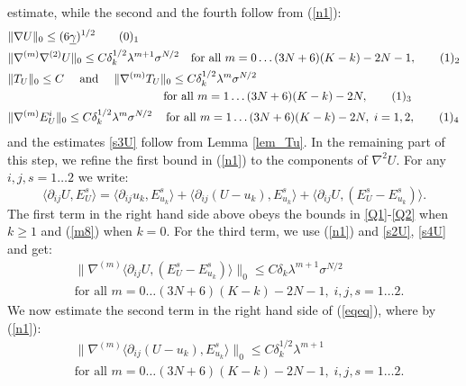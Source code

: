 \documentclass[reqno,twoside,11pt]{amsart}
\numberwithin{equation}{section}
\theoremstyle{plain}
\theoremstyle{definition}
\begin{document}
estimate, while the second and the fourth follow from (\ref{n1}):
\begin{align*}
& \|\nabla U\|_0\leq (6\underline\gamma)^{1/2}
\tag*{(\theequation)$_1$}\refstepcounter{equation} \label{s1U} \\
& \|\nabla^{(m)}\nabla^{(2)} U\|_0\leq 
C\delta_{k}^{1/2}\lambda^{m+1}\sigma^{N/2} \quad\mbox{for all } m=0\ldots (3N+6)(K-k)-2N-1,
\tag*{(\theequation)$_2$} \label{s2U} \\
& \|T_{U}\|_0\leq C \quad\mbox{ and }\quad
\|\nabla^{(m)}T_{U}\|_0\leq C\delta_k^{1/2}\lambda^m\sigma^{N/2} \\
& \qquad\qquad\qquad \qquad\qquad\qquad \quad
\mbox{ for all } m=1\ldots (3N+6)(K-k)-2N,
\tag*{(\theequation)$_3$} \label{s3U} \\
& \|\nabla^{(m)}E^i_{U}\|_0\leq
C\delta_k^{1/2}\lambda^m\sigma^{N/2}\quad\, \mbox{for all } m=1\ldots (3N+6)(K-k)-2N,\;i=1,2,
\tag*{(\theequation)$_4$} \label{s4U} 
\end{align*}
and the estimates \ref{s3U} follow from Lemma \ref{lem_Tu}.
In the remaining part of this step, we refine the first bound in (\ref{n1}) to the components of
$\nabla^2U$. For any $i,j,s=1\ldots 2$ we write:
\begin{equation}\label{eqeq}
\langle \partial_{ij}U, E^s_{U}\rangle = \langle \partial_{ij}u_k, E^s_{u_k}\rangle
+ \langle\partial_{ij}(U-u_k), E^s_{u_k}\rangle + \langle\partial_{ij}U, (E^s_U-E^s_{u_k})\rangle. 
\end{equation}
The first term in the right hand side above obeys the bounds in
\ref{Q1}-\ref{Q2} when $k\geq 1$ and (\ref{m8}) when $k=0$. For the third term, we use
(\ref{n1}) and \ref{s2U}, \ref{s4U} and get:
\begin{equation*}
\begin{split}
&\|\nabla^{(m)}\langle\partial_{ij}U, (E^s_U-E^s_{u_k})\rangle\|_0 \leq
C\delta_k\lambda^{m+1}\sigma^{N/2 }
\\ & \mbox{for all } m=0\ldots (3N+6)(K-k)-2N-1,\; i,j,s=1\ldots 2.
\end{split}
\end{equation*}
We now estimate the second term in the right hand
side of (\ref{eqeq}), where by (\ref{n1}):
\begin{equation*}
\begin{split}
& \|\nabla^{(m)}\langle\partial_{ij}(U-u_k), E^s_{u_k}\rangle\|_0 
\leq  C\delta_k^{1/2}\lambda^{m+1} \\ & 
\mbox{for all } m=0\ldots (3N+6)(K-k)-2N-1,\; i,j,s=1\ldots 2.
\end{split}
\end{equation*}
\end{document}
